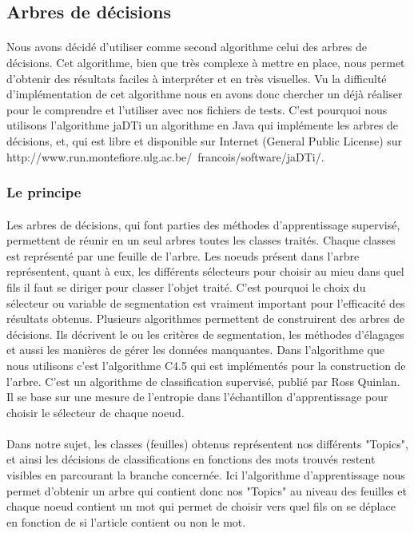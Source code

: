 \subsection{Arbres de décisions}

\paragraph{}
Nous avons décidé d'utiliser comme second algorithme celui des arbres de décisions. Cet algorithme, bien que très complexe à mettre en place, nous permet d'obtenir des résultats faciles à interpréter et en très visuelles.
Vu la difficulté d'implémentation de cet algorithme nous en avons donc chercher un déjà réaliser pour le comprendre et l'utiliser avec nos fichiers de tests. C'est pourquoi nous utilisons l'algorithme jaDTi un algorithme en Java qui implémente les arbres de décisions, et, qui est libre et disponible sur Internet (General Public License) sur http://www.run.montefiore.ulg.ac.be/~francois/software/jaDTi/.


\subsubsection{Le principe}

\paragraph{}
Les arbres de décisions, qui font parties des méthodes d’apprentissage supervisé,  permettent  de réunir en un seul arbres toutes les classes traités. Chaque classes est représenté par une feuille de l'arbre. Les noeuds présent dans l'arbre représentent, quant à eux, les différents sélecteurs pour choisir au mieu dans quel fils il faut se diriger pour classer l'objet traité. C'est pourquoi le choix du sélecteur ou variable de segmentation est vraiment important pour l'efficacité des résultats obtenus.  
Plusieurs algorithmes permettent de construirent des arbres de décisions. Ils  décrivent le ou les critères de segmentation, les méthodes d'élagages et aussi  les manières de gérer les données manquantes.
Dans l'algorithme que nous utilisons c'est l'algorithme C4.5 qui est implémentés pour la construction de l'arbre. C'est un algorithme de classification supervisé, publié par Ross Quinlan. Il se base sur une mesure de l'entropie dans l'échantillon d'apprentissage pour choisir le sélecteur de chaque noeud.

\paragraph{}
Dans notre sujet,  les classes (feuilles) obtenus représentent nos différents "Topics",  et ainsi  les décisions de classifications en fonctions des mots trouvés restent visibles en parcourant la branche concernée.
Ici l'algorithme d'apprentissage nous permet d'obtenir un arbre qui contient donc nos "Topics" au niveau des feuilles et chaque noeud contient un mot qui permet de choisir vers quel fils on se déplace en fonction de si l'article contient ou non le mot.  


